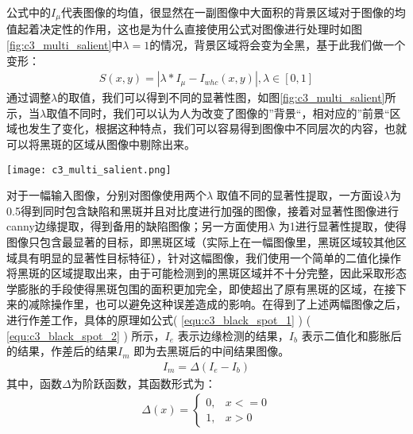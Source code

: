         公式中的$I_\mu$代表图像的均值，很显然在一副图像中大面积的背景区域对于图像的均值起着决定性的作用，这也是为什么直接使用公式对图像进行处理时如图\ref{fig:c3_multi_salient}中$\lambda = 1$的情况，背景区域将会变为全黑，基于此我们做一个变形：
        \begin{eqnarray}
        S\left( {x, y} \right) = \left| {\lambda * I_\mu - I_{whc}\left( {x, y}\right)} \right|, \lambda \in \left[ {0, 1} \right]
        \end{eqnarray}
        通过调整$\lambda$的取值，我们可以得到不同的显著性图，如图\ref{fig:c3_multi_salient}所示，当$\lambda$取值不同时，我们可以认为人为改变了图像的”背景“，相对应的”前景“区域也发生了变化，根据这种特点，我们可以容易得到图像中不同层次的内容，也就可以将黑斑的区域从图像中剔除出来。

        \begin{figure*}[!h]
        \centering
        \texttt{[image: c3\_multi\_salient.png]}
        \caption{使用不同$\lambda$的显著性检测效果，从左至右分别为$\lambda = 0.3$、$\lambda = 0.5$和$\lambda = 1$}
        \label{fig:c3_multi_salient}
        \end{figure*}

        对于一幅输入图像，分别对图像使用两个$\lambda$ 取值不同的显著性提取，一方面设$\lambda$为0.5得到同时包含缺陷和黑斑并且对比度进行加强的图像，接着对显著性图像进行canny边缘提取，得到备用的缺陷图像；另一方面使用$\lambda$ 为1进行显著性提取，使得图像只包含最显著的目标，即黑斑区域（实际上在一幅图像里，黑斑区域较其他区域具有明显的显著性目标特征），针对这幅图像，我们使用一个简单的二值化操作将黑斑的区域提取出来，由于可能检测到的黑斑区域并不十分完整，因此采取形态学膨胀的手段使得黑斑包围的面积更加完全，即使超出了原有黑斑的区域，在接下来的减除操作里，也可以避免这种误差造成的影响。在得到了上述两幅图像之后，进行作差工作，具体的原理如公式( \ref{equ:c3_black_spot_1} ) ( \ref{equ:c3_black_spot_2} ) 所示，$I_e$ 表示边缘检测的结果，$I_b$ 表示二值化和膨胀后的结果，作差后的结果$I_m$ 即为去黑斑后的中间结果图像。
        \begin{eqnarray}
        I_m = \Delta \left( {I_e - I_b} \right)
        \label{equ:c3_black_spot_1}
        \end{eqnarray}
        其中，函数$\Delta$为阶跃函数，其函数形式为：
        \begin{eqnarray}
        \Delta \left( x \right) = \left\{ \begin{matrix}
        0,&x<=0\\
        1,&x>0
        \end{matrix}\right.
        \label{equ:c3_black_spot_2}
        \end{eqnarray}
